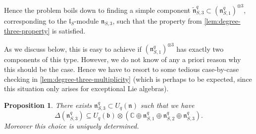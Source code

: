 \documentclass[a4paper, 12pt, reqno, english]{amsart}
\numberwithin{equation}{section}
\numberwithin{figure}{section}
\theoremstyle{plain}
\theoremstyle{plain}
\theoremstyle{plain}
\newtheorem{proposition}[theorem]{Proposition}
\theoremstyle{plain}
\theoremstyle{plain}
\theoremstyle{definition}
\theoremstyle{definition}
\theoremstyle{definition}
\theoremstyle{remark}
\theoremstyle{definition}
\theoremstyle{definition}
\newcommand{\Uqb}{U_q(\mathfrak{b})}
\newcommand{\Uqn}{U_q(\mathfrak{n})}
\newcommand{\bbC}{\mathbb{C}}
\newcommand{\liel}{\mathfrak{l}}
\newcommand{\lien}{\mathfrak{n}}
\newcommand{\qnil}{\lien^q}
\begin{document}
Hence the problem boils down to finding a simple component $\tilde{\lien}^q_{S, 3} \subset (\qnil_{S, 1})^{\otimes 3}$, corresponding to the $\liel_S$-module $\lien_{S, 3}$, such that the property from \cref{lem:degree-three-property} is satisfied.

As we discuss below, this is easy to achieve if $(\qnil_{S, 1})^{\otimes 3}$ has exactly two components of this type. However, we do not know of any a priori reason why this should be the case.
Hence we have to resort to some tedious case-by-case checking in \cref{lem:degree-three-multiplicity} (which is perhaps to be expected, since this situation only arises for exceptional Lie algebras).

\begin{proposition}
\label{prop:coideal-degree-three}
There exists $\lien^q_{S, 3} \subset \Uqn$ such that we have
\[
\Delta(\lien^q_{S, 3}) \subseteq \Uqb \otimes (\bbC \oplus \qnil_{S, 1} \oplus \qnil_{S, 2} \oplus \qnil_{S, 3}).
\]
Moreover this choice is uniquely determined.
\end{proposition}
\end{document}
